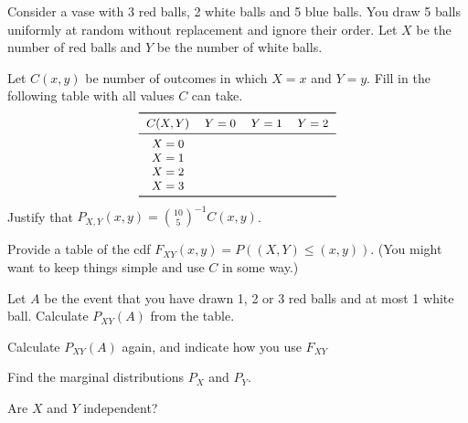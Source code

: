 \documentclass[a4paper,10pt,landscape,twocolumn]{scrartcl}
\begin{document}
\begin{exercise}
  Consider a vase with 3 red balls, 2 white balls and 5 blue balls. You draw 5
  balls uniformly at random without replacement and ignore their order. Let $X$
  be the number of red balls and $Y$ be the number of white balls.
  
  \begin{subex}[1pt]
    Let $C(x,y)$ be	number of outcomes in which $X=x$ and $Y=y$. Fill in the
    following table with all values $C$ can take.	
	\[\small{
		\begin{tabular}{c c c c}
		\toprule
		$C(X,Y)$&$Y=0$	&$Y=1$ &$Y=2$\\\midrule
		$X=0$	&		&  		&\\
		$X=1$	&		&		&\\
		$X=2$	&		&		&\\
		$X=3$	&		&		&\\\bottomrule		
		\end{tabular}}
	\]
	Justify that $P_{X,Y}(x,y) = {10 \choose 5}^{-1} C(x,y)$.
  \end{subex}
  
  \begin{subex}[1pt]
    Provide a table of the cdf $F_{XY}(x,y) = P((X,Y) \le (x,y))$. (You might
    want to keep things simple and use $C$ in some way.)
  \end{subex}
  
  \begin{subex}[0.5pt]
    Let $A$ be the event that you have drawn 1, 2 or 3 red balls and at most 1
    white ball. Calculate $P_{XY}(A)$ from the table.
  \end{subex}
  
  \begin{subex}[0.5pt]
    Calculate $P_{XY}(A)$ again, and indicate how you use $F_{XY}$	
  \end{subex}
  
  \begin{subex}[0.5pt]
    Find the marginal distributions $P_X$ and $P_Y$.	
  \end{subex}

  \begin{subex}[0.5pt]
    Are $X$ and $Y$ independent?	
  \end{subex}
\end{exercise}

\end{document}
